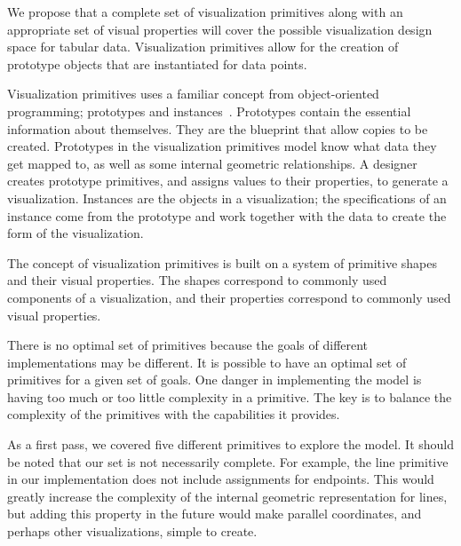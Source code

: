 \label{model}

We propose that a complete set of visualization primitives along with an appropriate set of visual properties will cover the possible visualization design space for tabular data.
Visualization primitives allow for the creation of prototype objects that are instantiated for data points.

Visualization primitives uses a familiar concept from object-oriented programming; prototypes and instances~\cite{Taivalsaari1997}.
Prototypes contain the essential information about themselves.
They are the blueprint that allow copies to be created.
Prototypes in the visualization primitives model know what data they get mapped to, as well as some internal geometric relationships.
A designer creates prototype primitives, and assigns values to their properties, to generate a visualization.
Instances are the objects in a visualization; the specifications of an instance come from the prototype and work together with the data to create the form of the visualization.

\label{prototypes}

The concept of visualization primitives is built on a system of primitive shapes and their visual properties.
The shapes correspond to commonly used components of a visualization, and their properties correspond to commonly used visual properties.


There is no optimal set of primitives because the goals of different implementations may be different.
It is possible to have an optimal set of primitives for a given set of goals.
One danger in implementing the model is having too much or too little complexity in a primitive.
The key is to balance the complexity of the primitives with the capabilities it provides.

As a first pass, we covered five different primitives to explore the model.
It should be noted that our set is not necessarily complete.
For example, the line primitive in our implementation does not include assignments for endpoints.
This would greatly increase the complexity of the internal geometric representation for lines, but adding this property in the future would make parallel coordinates, and perhaps other visualizations, simple to create.

\label{visualProperties}


